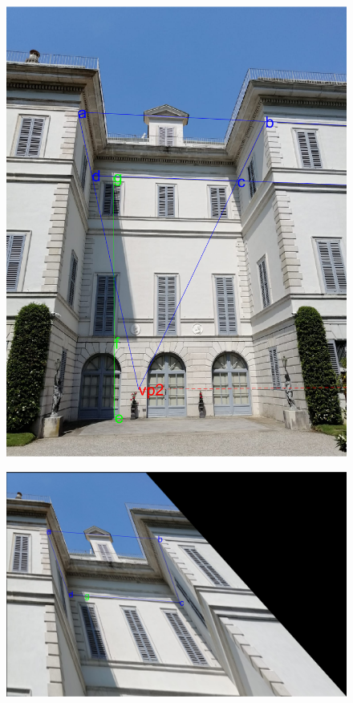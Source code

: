 \documentclass[11pt, oneside]{article}
\begin{document}
\begin{figure}[!h]
	\centering
	\begin{minipage}{.40\textwidth}
		\centering
		\includegraphics[scale = 0.35]{image_original_lines.png}
		\label{image_original_lines}
	\end{minipage}%
	\quad
	\begin{minipage}{.55\textwidth}
		\centering
		\includegraphics[scale = 0.35]{image_affine_reconstruction.png}
		\label{image_affine_reconstruction}
	\end{minipage}
\end{figure}
\pagebreak
\end{document}
